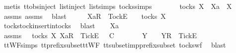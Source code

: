 \begin{isabellebody}
\ {\isacharparenleft}metis\ ttobs{\isachardot}inject{\isacharparenleft}{}{\isacharparenright}\ list{\isachardot}inject\ list{\isachardot}simps{\isacharparenleft}{}{\isacharparenright}\ tocks{\isachardot}simps{\isacharparenright}\isanewline
\ \ \isamarkupfalse%
\ \isamarkupfalse%
\ {\isachardoublequoteopen}{\isasymrho}\ {\isasymin}\ tocks\ X\ {\isasymand}\ Xa\ {\isasymsubseteq}\ X{\isachardoublequoteclose}\isanewline
\ \ \ \ \isamarkupfalse%
\ assms{\isacharparenleft}{}{\isacharparenright}\ assms{\isacharparenleft}{}{\isacharparenright}\ \isamarkupfalse%
\ blast\isanewline
\ \ \isamarkupfalse%
\ \isamarkupfalse%
\ {\isachardoublequoteopen}{\isacharbrackleft}Xa{\isacharbrackright}\isactrlsub R\ {\isacharhash}\ {\isacharbrackleft}Tock{\isacharbrackright}\isactrlsub E\ {\isacharhash}\ {\isasymrho}\ {\isasymin}\ tocks\ X{\isachardoublequoteclose}\isanewline
\ \ \ \ \isamarkupfalse%
\ tocks{\isachardot}tock{\isacharunderscore}insert{\isacharunderscore}in{\isacharunderscore}tocks\ \isamarkupfalse%
\ blast\isanewline
{}\isamarkupfalse%
\isanewline
\ \ \isamarkupfalse%
\ Xa\ {\isasymrho}\ {\isasymsigma}\isanewline
\ \ \isamarkupfalse%
\ assms{\isacharcolon}\ {\isachardoublequoteopen}{\isasymsigma}\ {\isasymin}\ tocks\ X{\isachardoublequoteclose}\ {\isachardoublequoteopen}{\isacharbrackleft}Xa{\isacharbrackright}\isactrlsub R\ {\isacharhash}\ {\isacharbrackleft}Tick{\isacharbrackright}\isactrlsub E\ {\isacharhash}\ {\isasymrho}\ {\isasymsubseteq}\isactrlsub C\ {\isasymsigma}{\isachardoublequoteclose}\isanewline
\ \ \isamarkupfalse%
\ \isamarkupfalse%
\ {\isasymsigma}{\isacharprime}\ Y\ \ {\isachardoublequoteopen}{\isasymsigma}\ {\isacharequal}\ {\isacharbrackleft}Y{\isacharbrackright}\isactrlsub R\ {\isacharhash}\ {\isacharbrackleft}Tick{\isacharbrackright}\isactrlsub E\ {\isacharhash}\ {\isasymsigma}{\isacharprime}{\isachardoublequoteclose}\isanewline
\ \ \ \ \isamarkupfalse%
\ ttWF{\isachardot}simps{\isacharparenleft}{}{}{\isacharparenright}\ tt{\isacharunderscore}prefix{\isacharunderscore}subset{\isacharunderscore}ttWF\ tt{\isacharunderscore}subset{\isacharunderscore}imp{\isacharunderscore}prefix{\isacharunderscore}subset\ tocks{\isacharunderscore}wf\ \isamarkupfalse%
\ blast\isanewline
\ \ \isamarkupfalse%

\end{isabellebody}
